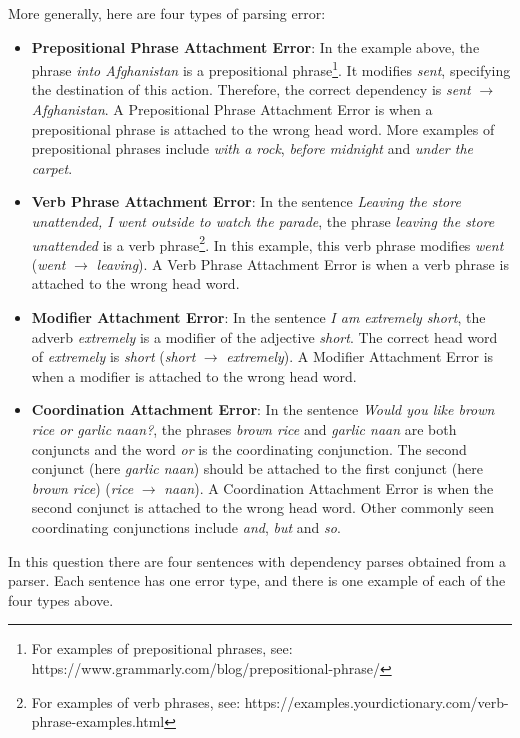 \begin{parts}
    More generally, here are four types of parsing error:
    \begin{itemize}
        \item \textbf{Prepositional Phrase Attachment Error}: In the example above, the phrase \textit{into Afghanistan} is a prepositional phrase\footnote{For examples of prepositional phrases, see: https://www.grammarly.com/blog/prepositional-phrase/}. It modifies \textit{sent}, specifying the destination of this action. Therefore, the correct dependency is \textit{sent} $\rightarrow$ \textit{Afghanistan}.
        A Prepositional Phrase Attachment Error is when a prepositional phrase is attached to the wrong head word.
        More examples of prepositional phrases include \textit{with a rock}, \textit{before midnight} and \textit{under the carpet}.
        \item \textbf{Verb Phrase Attachment Error}: In the sentence \textit{Leaving the store unattended, I went outside to watch the parade}, the phrase \textit{leaving the store unattended} is a verb phrase\footnote{For examples of verb phrases, see: https://examples.yourdictionary.com/verb-phrase-examples.html}. In this example, this verb phrase modifies \textit{went} (\textit{went} $\rightarrow$ \textit{leaving}).
        A Verb Phrase Attachment Error is when a verb phrase is attached to the wrong head word.
        \item \textbf{Modifier Attachment Error}: In the sentence \textit{I am extremely short}, the adverb \textit{extremely} is a modifier of the adjective \textit{short}. The correct head word of \textit{extremely} is \textit{short} (\textit{short} $\rightarrow$ \textit{extremely}). A Modifier Attachment Error is when a modifier is attached to the wrong head word.
        \item \textbf{Coordination Attachment Error}: In the sentence \textit{Would you like brown rice or garlic naan?}, the phrases \textit{brown rice} and \textit{garlic naan} are both conjuncts and the word \textit{or} is the coordinating conjunction. The second conjunct (here \textit{garlic naan}) should be attached to the first conjunct (here \textit{brown rice}) (\textit{rice} $\rightarrow$ \textit{naan}). A Coordination Attachment Error is when the second conjunct is attached to the wrong head word. Other commonly seen coordinating conjunctions include \textit{and}, \textit{but} and \textit{so}.
    \end{itemize}
    In this question there are four sentences with dependency parses obtained from a parser. Each sentence has one error type, and there is one example of each of the four types above.

\end{parts}
